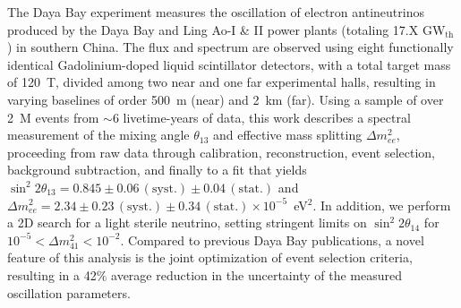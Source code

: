 The Daya Bay experiment measures the oscillation of electron antineutrinos produced by the Daya Bay and Ling Ao-I \& II power plants (totaling 17.X GW$_\mathrm{th}$) in southern China. The flux and spectrum are observed using eight functionally identical Gadolinium-doped liquid scintillator detectors, with a total target mass of 120~T, divided among two near and one far experimental halls, resulting in varying baselines of order 500~m (near) and 2~km (far). Using a sample of over 2~M events from $\sim$6 livetime-years of data, this work describes a spectral measurement of the mixing angle $\theta_{13}$ and effective mass splitting $\Delta m^2_{ee}$, proceeding from raw data through calibration, reconstruction, event selection, background subtraction, and finally to a fit that yields $\sin^2 2\theta_{13} = 0.845 \pm 0.06\,\mathrm{(syst.)} \pm 0.04\,\mathrm{(stat.)}$ and $\Delta m^2_{ee} = 2.34 \pm 0.23\,\mathrm{(syst.)} \pm 0.34\,\mathrm{(stat.)} \times 10^{-5}$~eV$^2$. In addition, we perform a 2D search for a light sterile neutrino, setting stringent limits on $\sin^2 2\theta_{14}$ for $10^{-5} < \Delta m^2_{41} < 10^{-2}$. Compared to previous Daya Bay publications, a novel feature of this analysis is the joint optimization of event selection criteria, resulting in a 42$\%$ average reduction in the uncertainty of the measured oscillation parameters.
